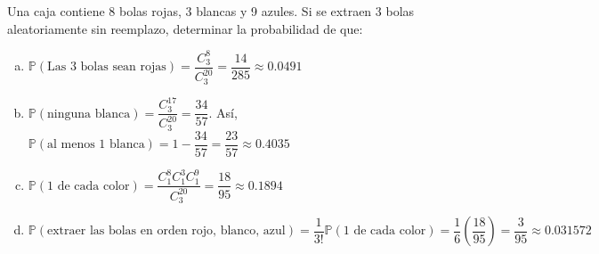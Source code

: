 \addpoints
\question[10] 
Una caja contiene 8 bolas rojas, 3 blancas y 9 azules. Si se extraen 3 bolas aleatoriamente sin reemplazo, determinar la probabilidad de que:
\noaddpoints
{}

\begin{solution}
\begin{enumerate}[a)]
\item  $\displaystyle \mathbb{P}(\text{Las 3 bolas sean rojas})=\dfrac{C_{3}^{8}}{C_{3}^{20}}=\dfrac{14}{285}\approx 0.0491$
\item  $\mathbb{P}(\text{ninguna blanca})=\dfrac{C_{3}^{17}}{C_{3}^{20}}=\dfrac{34}{57}$. Así, $\mathbb{P}(\text{al menos 1 blanca})=1-\dfrac{34}{57}=\dfrac{23}{57}\approx 0.4035$
\item  $\mathbb{P}(\text{1 de cada color})=\dfrac{C_{1}^{8} C_{1}^{3} C_{1}^{9}}{C_{3}^{20}}=\dfrac{18}{95}\approx 0.1894$
\item  $\mathbb{P}(\text{extraer las bolas en orden rojo, blanco, azul})=\dfrac{1}{3!}\mathbb{P}(\text{1 de cada color})=\dfrac{1}{6}\left( \dfrac{18}{95}\right)=\dfrac{3}{95}\approx 0.031572$
\end{enumerate}
\end{solution}